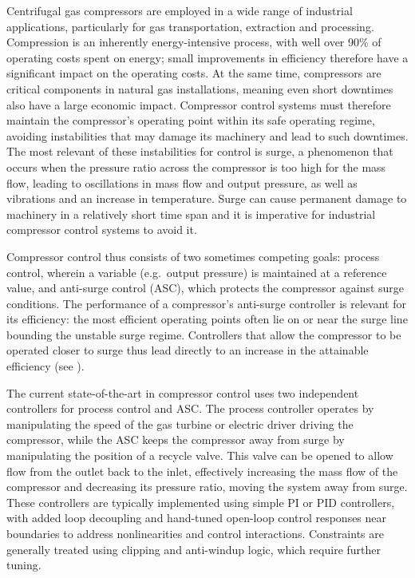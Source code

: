 Centrifugal gas compressors are employed in a wide range of industrial applications, particularly for gas transportation, extraction and processing.
Compression is an inherently energy-intensive process, with well over 90\% of operating costs spent on energy; small improvements in efficiency therefore have a significant impact on the operating costs.
At the same time, compressors are critical components in natural gas installations, meaning even short downtimes also have a large economic impact.
Compressor control systems must therefore maintain the compressor's operating point within its safe operating regime, avoiding instabilities that may damage its machinery and lead to such downtimes.
The most relevant of these instabilities for control is surge, a phenomenon that occurs when the pressure ratio across the compressor is too high for the mass flow, leading to oscillations in mass flow and output pressure, as well as vibrations and an increase in temperature.
Surge can cause permanent damage to machinery in a relatively short time span and it is imperative for industrial compressor control systems to avoid it.

Compressor control thus consists of two sometimes competing goals: process control, wherein a variable (e.g.\ output pressure) is maintained at a reference value, and anti-surge control (ASC), which protects the compressor against surge conditions.
The performance of a compressor's anti-surge controller is relevant for its efficiency: the most efficient operating points often lie on or near the surge line bounding the unstable surge regime.
Controllers that allow the compressor to be operated closer to surge thus lead directly to an increase in the attainable efficiency (see \cite{Cortinovis2014}).

The current state-of-the-art in compressor control uses two independent controllers for process control and ASC\@.
The process controller operates by manipulating the speed of the gas turbine or electric driver driving the compressor, while the ASC keeps the compressor away from surge by manipulating the position of a recycle valve.
This valve can be opened to allow flow from the outlet back to the inlet, effectively increasing the mass flow of the compressor and decreasing its pressure ratio, moving the system away from surge.
These controllers are typically implemented using simple PI or PID controllers, with added loop decoupling and hand-tuned open-loop control responses near boundaries to address nonlinearities and control interactions.
Constraints are generally treated using clipping and anti-windup logic, which require further tuning.

